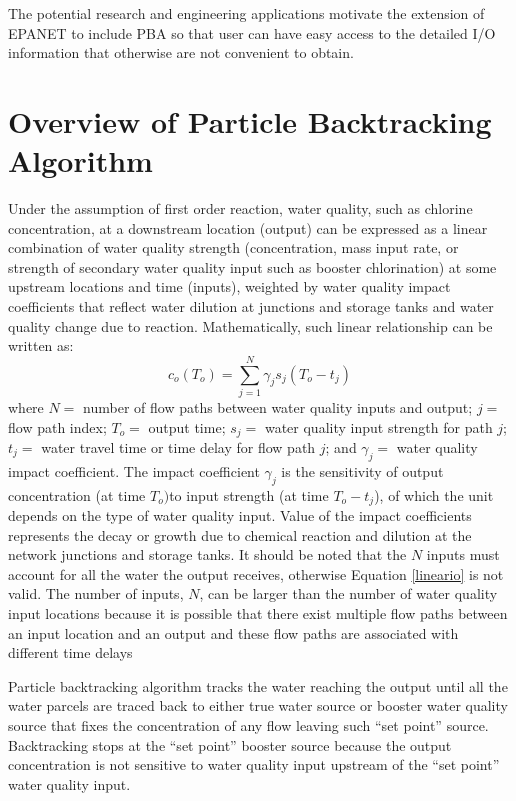 \documentclass[12pt,letterpaper]{article}
\begin{document}
The potential research and engineering applications motivate the
extension of EPANET \cite{Rossman2000} to include PBA so that user
can have easy access to the detailed I/O information that otherwise
are not convenient to obtain.
\section*{Overview of Particle Backtracking Algorithm}
Under the assumption of first order reaction, water quality, such as
chlorine concentration, at a downstream location (output) can be
expressed as a linear combination of water quality strength
(concentration, mass input rate, or strength of secondary water
quality input such as booster chlorination) at some upstream
locations and time (inputs), weighted by water quality impact
coefficients that reflect water dilution at junctions and storage
tanks and water quality change due to reaction. Mathematically, such
linear relationship can be written as:
\begin{equation}\label{lineario}
c_o(T_o)=\sum_{j=1}^N\gamma_js_{j}(T_o-t_j)
\end{equation}
where $N=$ number of flow paths between water quality inputs and
output; $j=$ flow path index; $T_o=$ output time; $s_{j}=$ water
quality input strength for path $j$; $t_j=$ water travel time or
time delay for flow path $j$; and $\gamma_j=$ water quality impact
coefficient. The impact coefficient $\gamma_j$ is the sensitivity of
output concentration (at time $T_o) $to input strength (at time
$T_o-t_j$), of which the unit depends on the type of water quality
input. Value of the impact coefficients represents the decay or
growth due to chemical reaction and dilution at the network
junctions and storage tanks. It should be noted that the $N$ inputs
must account for all the water the output receives, otherwise
Equation \ref{lineario} is not valid. The number of inputs, $N$, can
be larger than the number of water quality input locations because
it is possible that there exist multiple flow paths between an input
location and an output and these flow paths are associated with
different time delays

Particle backtracking algorithm tracks the water reaching the output
until all the water parcels are traced back to either true water
source or booster water quality source that fixes the concentration
of any flow leaving such ``set point'' source. Backtracking stops at
the ``set point'' booster source because the output concentration is
not sensitive to water quality input upstream of the ``set point''
water quality input.
\end{document}
